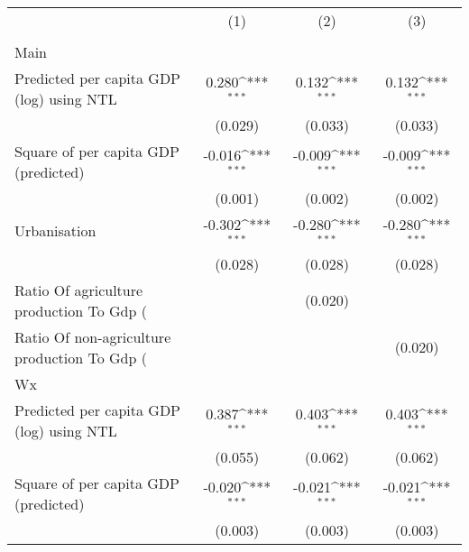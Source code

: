 {
\def\sym#1{\ifmmode^{#1}\else\(^{#1}\)\fi}
\begin{tabular}{l*{3}{c}}
\hline\hline
                    &\multicolumn{1}{c}{(1)}&\multicolumn{1}{c}{(2)}&\multicolumn{1}{c}{(3)}\\
                    &\multicolumn{1}{c}{ }&\multicolumn{1}{c}{ }&\multicolumn{1}{c}{ }\\
\hline
Main                &                     &                     &                     \\
Predicted per capita GDP (log) using NTL&       0.280\sym{***}&       0.132\sym{***}&       0.132\sym{***}\\
                    &     (0.029)         &     (0.033)         &     (0.033)         \\
[1em]
Square of per capita GDP (predicted)&      -0.016\sym{***}&      -0.009\sym{***}&      -0.009\sym{***}\\
                    &     (0.001)         &     (0.002)         &     (0.002)         \\
[1em]
Urbanisation        &      -0.302\sym{***}&      -0.280\sym{***}&      -0.280\sym{***}\\
                    &     (0.028)         &     (0.028)         &     (0.028)         \\
[1em]
Ratio Of agriculture production To Gdp (%
                    &                     &     (0.020)         &                     \\
[1em]
Ratio Of non-agriculture production To Gdp (%
                    &                     &                     &     (0.020)         \\
\hline
Wx                  &                     &                     &                     \\
Predicted per capita GDP (log) using NTL&       0.387\sym{***}&       0.403\sym{***}&       0.403\sym{***}\\
                    &     (0.055)         &     (0.062)         &     (0.062)         \\
[1em]
Square of per capita GDP (predicted)&      -0.020\sym{***}&      -0.021\sym{***}&      -0.021\sym{***}\\
                    &     (0.003)         &     (0.003)         &     (0.003)         \\

\end{tabular}}
